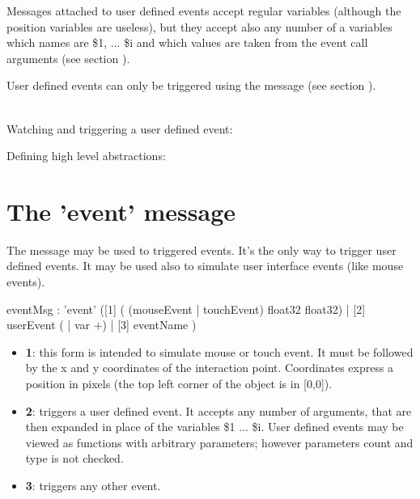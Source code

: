 \documentclass[a4paper,twoside]{report}
\newcommand{\sublevel}[1]	{\section{#1}}
\begin{document}
Messages attached to user defined events accept regular variables (although the position variables are useless), 
but they accept also any number of a variables which names are \$1, ... \$i and which values are taken from the event call arguments (see section ).

User defined events can only be triggered using the  message (see section ).

\example \\
Watching and triggering a user defined event:

Defining high level abstractions:


\sublevel{The 'event' message}
\label{eventMsg}

The  message may be used to triggered events. It's the only way to trigger user defined events. 
It may be used also to simulate user interface events (like mouse events).


\begin{rail}
eventMsg :  'event' 
			([1] ( (mouseEvent | touchEvent) float32 float32) 
			| [2] userEvent ( | var +)
			| [3] eventName
			)
\end{rail}

\begin{itemize}
\item \textbf{1}: this form is intended to simulate mouse or touch event. It must be followed by the x and y coordinates of the interaction point. Coordinates express a position in pixels (the top left corner of the object is in [0,0]).
\item \textbf{2}: triggers a user defined event. It accepts any number of arguments, that are then expanded in place of the variables \$1 ... \$i. User defined events may be viewed as functions with arbitrary parameters; however parameters count and type is not checked. 
\item \textbf{3}: triggers any other event. 
\end{itemize}
\end{document}
